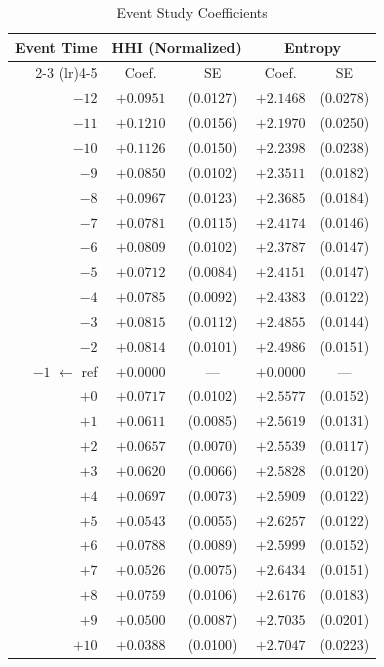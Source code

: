 \begin{table}[H]
\centering
\caption{Event Study Coefficients}
\label{tab:event_study_coefs}
\small
\begin{tabular}{rcccc}
\toprule
Event Time & \multicolumn{2}{c}{HHI (Normalized)} & \multicolumn{2}{c}{Entropy} \\
\cmidrule(lr){2-3} \cmidrule(lr){4-5}
 & Coef. & SE & Coef. & SE \\
\midrule
$-12$ & $+0.0951$ & (0.0127) & $+2.1468$ & (0.0278) \\
$-11$ & $+0.1210$ & (0.0156) & $+2.1970$ & (0.0250) \\
$-10$ & $+0.1126$ & (0.0150) & $+2.2398$ & (0.0238) \\
$-9$ & $+0.0850$ & (0.0102) & $+2.3511$ & (0.0182) \\
$-8$ & $+0.0967$ & (0.0123) & $+2.3685$ & (0.0184) \\
$-7$ & $+0.0781$ & (0.0115) & $+2.4174$ & (0.0146) \\
$-6$ & $+0.0809$ & (0.0102) & $+2.3787$ & (0.0147) \\
$-5$ & $+0.0712$ & (0.0084) & $+2.4151$ & (0.0147) \\
$-4$ & $+0.0785$ & (0.0092) & $+2.4383$ & (0.0122) \\
$-3$ & $+0.0815$ & (0.0112) & $+2.4855$ & (0.0144) \\
$-2$ & $+0.0814$ & (0.0101) & $+2.4986$ & (0.0151) \\
$-1$ $\leftarrow$ ref & $+0.0000$ & --- & $+0.0000$ & --- \\
$+0$ & $+0.0717$ & (0.0102) & $+2.5577$ & (0.0152) \\
$+1$ & $+0.0611$ & (0.0085) & $+2.5619$ & (0.0131) \\
$+2$ & $+0.0657$ & (0.0070) & $+2.5539$ & (0.0117) \\
$+3$ & $+0.0620$ & (0.0066) & $+2.5828$ & (0.0120) \\
$+4$ & $+0.0697$ & (0.0073) & $+2.5909$ & (0.0122) \\
$+5$ & $+0.0543$ & (0.0055) & $+2.6257$ & (0.0122) \\
$+6$ & $+0.0788$ & (0.0089) & $+2.5999$ & (0.0152) \\
$+7$ & $+0.0526$ & (0.0075) & $+2.6434$ & (0.0151) \\
$+8$ & $+0.0759$ & (0.0106) & $+2.6176$ & (0.0183) \\
$+9$ & $+0.0500$ & (0.0087) & $+2.7035$ & (0.0201) \\
$+10$ & $+0.0388$ & (0.0100) & $+2.7047$ & (0.0223) \\
\bottomrule
\end{tabular}
\end{table}
